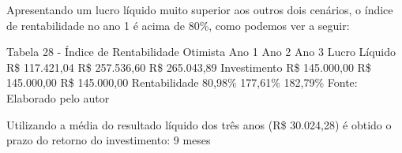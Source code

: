 Apresentando um lucro líquido muito superior aos outros dois cenários, o índice de rentabilidade no ano 1 é acima de 80\%, como podemos ver a seguir: 

Tabela 28 - Índice de Rentabilidade Otimista 
Ano 1	Ano 2	Ano 3
Lucro Líquido	R\$   117.421,04	R\$   257.536,60	R\$   265.043,89
Investimento	R\$   145.000,00	R\$   145.000,00	R\$   145.000,00
Rentabilidade	80,98\%	177,61\%	182,79\%
Fonte: Elaborado pelo autor 

Utilizando a média do resultado líquido dos três anos (R\$ 30.024,28) é obtido o prazo do retorno do investimento: 9 meses

